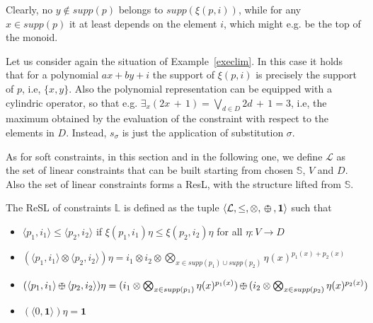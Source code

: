 \documentclass{llncs}
\def\monid{{\mathbf 0}}
\def\monop{\otimes}
\def\odiv{\, {\ominus\hspace{-7.7pt} \div} \,}
\def\monid{\mathbf{1}}
\begin{document}
Clearly, no $y \not \in supp(p)$ belongs to $supp(\xi(p,i))$,
%
while for any $x \in supp(p)$ it at least depends on the element 
$i$, which might e.g. be the top of the monoid.

\begin{example}[Continued...]
	Let us consider again the situation of Example~\ref{execlim}.
	In this case it holds that for a polynomial $ax + by + i$ the support 
	of $\xi(p,i)$ is precisely the support of $p$, i.e, $\{x, y\}$.
	Also the polynomial representation can be equipped with a cylindric operator, so that
	e.g. $\exists_x(2x \, + \, 1) = \bigvee_{d \in D} 2d\, + \, 1 = 3$, i.e,
	the maximum obtained by the evaluation of the constraint with respect 
	to the elements in $D$.
	Instead, $s_\sigma$ is just the application of substitution $\sigma$.
%	
\end{example}


As for soft constraints, in this section and in the following one, we define $\mathcal{L}$ 
as the set of linear constraints that can be built starting from chosen $\mathbb S$, $V$ and $D$. 
%
Also the set of linear constraints forms a ResL, with the structure
lifted from ${\mathbb S}$.

\begin{lemma}\label{prop:soft}
	The ReSL of constraints $\mathbb{L}$ is
	defined as the tuple $\langle \mathcal{L}, \leq, \monop, \odiv, \monid \rangle$ such that
	
	\begin{itemize}
		\item $\langle p_1, i_1 \rangle \leq \langle p_2, i_2 \rangle$ if $\xi(p_1, i_1)\eta\leq \xi(p_2, i_2)\eta$ for all $\eta: V \rightarrow D$
		\item $(\langle p_1, i_1 \rangle \monop \langle p_2, i_2 \rangle)\eta = i_1 \otimes i_2 \otimes \bigotimes_{x \in supp(p_1) \cup supp(p_2)} \eta(x)^{p_1(x) + p_2(x)}$
		\item $(\langle p_1, i_1 \rangle \odiv \langle p_2, i_2 \rangle)\eta = (i_1 \otimes \bigotimes_{x \in supp(p_1)} \eta(x)^{p_1(x)}) \odiv (i_2 \otimes \bigotimes_{x \in supp(p_2)} \eta(x)^{p_2(x)})$
		\item $(\langle 0, \monid \rangle) \eta = \monid$
	\end{itemize}
\end{lemma}
\end{document}
